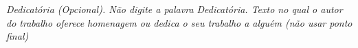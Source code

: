 \clearpage
    \vspace*{\fill}
    \vspace{3.8cm}
    \hspace{.2\textwidth}
   	\begin{minipage}{.75\textwidth}
   	    \renewcommand{\baselinestretch}{1.5}
   		\textit{Dedicatória (Opcional). Não digite a palavra Dedicatória. Texto no qual o autor do trabalho oferece homenagem ou dedica o seu trabalho a alguém (não usar ponto final)}
	\end{minipage}
    \vspace*{\fill}

